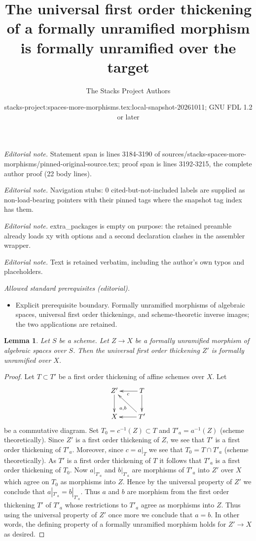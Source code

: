 \documentclass[10pt,a4paper]{amsart}
\title{The universal first order thickening of a formally unramified morphism is formally unramified over the target}
\author{The Stacks Project Authors}
\date{stacks-project:spaces-more-morphisms.tex:local-snapshot-20261011; GNU FDL 1.2 or later}
\theoremstyle{plain}
\newtheorem{lemma}[subsection]{Lemma}
\theoremstyle{definition}
\theoremstyle{remark}
\numberwithin{equation}{subsection}
\begin{document}
\maketitle
\noindent\textit{Editorial note.} Statement span is lines 3184-3190 of sources/stacks-spaces-more-morphisms/pinned-original-source.tex; proof span is lines 3192-3215, the complete author proof (22 body lines).\par\medskip
\noindent\textit{Editorial note.} Navigation stubs: 0 cited-but-not-included labels are supplied as non-load-bearing pointers with their pinned tags where the snapshot tag index has them.\par\medskip
\noindent\textit{Editorial note.} extra\_packages is empty on purpose: the retained preamble already loads xy with options and a second declaration clashes in the assembler wrapper.\par\medskip
\noindent\textit{Editorial note.} Text is retained verbatim, including the author's own typos and placeholders.\par\medskip
\noindent\textit{Allowed standard prerequisites (editorial).}\begin{itemize}
\item Explicit prerequisite boundary. Formally unramified morphisms of algebraic spaces, universal first order thickenings, and scheme-theoretic inverse images; the two applications are retained.
\end{itemize}\medskip
\begin{lemma}
\label{lemma-universal-thickening-unramified}
Let $S$ be a scheme.
Let $Z \to X$ be a formally unramified morphism of algebraic spaces over $S$.
Then the universal first order thickening $Z'$ is formally
unramified over $X$.
\end{lemma}

\begin{proof}
Let $T \subset T'$ be a first order thickening of affine schemes over $X$.
Let
$$
\xymatrix{
Z' \ar[d] & T \ar[l]^c \ar[d] \\
X & T' \ar[l] \ar[lu]^{a, b}
}
$$
be a commutative diagram. Set $T_0 = c^{-1}(Z) \subset T$ and
$T'_a = a^{-1}(Z)$ (scheme theoretically).
Since $Z'$ is a first order thickening of $Z$, we see that $T'$
is a first order thickening of $T'_a$. Moreover, since $c = a|_T$ we see that
$T_0 = T \cap T'_a$ (scheme theoretically). As $T'$ is a first order
thickening of $T$ it follows that $T'_a$
is a first order thickening of $T_0$. Now $a|_{T'_a}$ and $b|_{T'_a}$
are morphisms of $T'_a$ into $Z'$ over $X$ which agree on $T_0$ as
morphisms into $Z$. Hence by the universal property of $Z'$ we conclude that
$a|_{T'_a} = b|_{T'_a}$. Thus $a$ and $b$ are morphism from
the first order thickening $T'$ of $T'_a$ whose restrictions to
$T'_a$ agree as morphisms into $Z$. Thus using the universal property of
$Z'$ once more we conclude that $a = b$. In other words, the defining
property of a formally unramified morphism holds for $Z' \to X$ as desired.
\end{proof}
\end{document}
